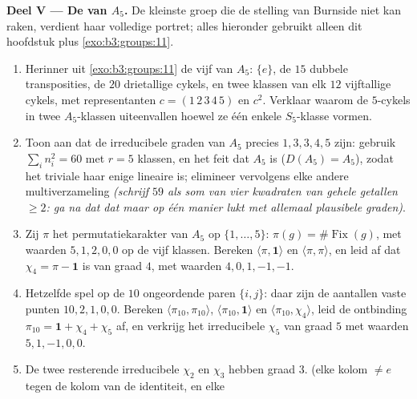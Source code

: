 \begin{problem}
\medskip
\noindent\textbf{Deel V --- De  van $A_5$.} De
kleinste groep die de stelling van Burnside niet kan raken,
verdient haar volledige portret; alles hieronder gebruikt alleen
dit hoofdstuk plus \cref{exo:b3:groups:11}.
\begin{enumerate}[resume]
  \item Herinner uit \cref{exo:b3:groups:11} de vijf
         van $A_5$: $\{e\}$, de $15$ dubbele
        transposities, de $20$ drietallige cykels, en twee klassen
        van elk $12$ vijftallige cykels, met representanten $c =
        (1\,2\,3\,4\,5)$ en $c^2$. Verklaar waarom de $5$-cykels
        in twee $A_5$-klassen uiteenvallen hoewel ze één enkele
        $S_5$-klasse vormen.
  \item Toon aan dat de irreducibele graden van $A_5$ precies $1,
        3, 3, 4, 5$ zijn: gebruik $\sum_in_i^2 = 60$ met $r = 5$
        klassen, en het feit dat $A_5$  is ($D(A_5) =
        A_5$), zodat het triviale  haar enige lineaire is;
        elimineer vervolgens elke andere multiverzameling
        \emph{(schrijf $59$ als som van vier kwadraten van gehele
        getallen $\geq 2$: ga na dat dat maar op één manier lukt
        met allemaal plausibele graden)}.
  \item Zij $\pi$ het permutatiekarakter van $A_5$ op $\{1, \dots,
        5\}$: $\pi(g) = \#\operatorname{Fix}(g)$, met waarden $5,
        1, 2, 0, 0$ op de vijf klassen. Bereken $\langle\pi,
        \mathbf 1\rangle$ en $\langle\pi, \pi\rangle$, en leid af
        dat $\chi_4 = \pi - \mathbf 1$  is van graad
        $4$, met waarden $4, 0, 1, -1, -1$.
  \item Hetzelfde spel op de $10$ ongeordende paren $\{i, j\}$:
        daar zijn de aantallen vaste punten $10, 2, 1, 0, 0$.
        Bereken $\langle\pi_{10}, \pi_{10}\rangle$,
        $\langle\pi_{10}, \mathbf 1\rangle$ en $\langle\pi_{10},
        \chi_4\rangle$, leid de ontbinding $\pi_{10} = \mathbf 1 +
        \chi_4 + \chi_5$ af, en verkrijg het irreducibele
        $\chi_5$ van graad $5$ met waarden $5, 1, -1, 0, 0$.
  \item De twee resterende irreducibele  $\chi_2$ en
        $\chi_3$ hebben graad $3$.  (elke
        kolom $\neq e$ tegen de kolom van de identiteit, en elke

\end{enumerate}
\end{problem}
